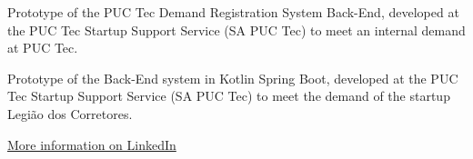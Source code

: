 
Prototype of the PUC Tec Demand Registration System Back-End, developed at the PUC Tec Startup Support Service (SA PUC Tec) to meet an internal demand at PUC Tec.\\
\divider

Prototype of the Back-End system in Kotlin Spring Boot, developed at the PUC Tec Startup Support Service (SA PUC Tec) to meet the demand of the startup Legião dos Corretores.\\
\divider

{\large\color{emphasis}\href{https://www.linkedin.com/in/henriquemcc/details/projects/}{More information on LinkedIn}}